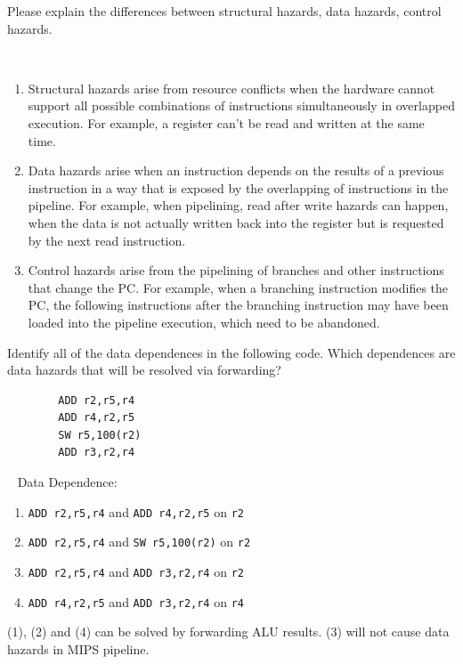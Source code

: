 \begin{exercise}[]{
    Please explain the differences between structural hazards, data hazards, control hazards.
    }
  \begin{solution}
  \par{~}
  \begin{enumerate}
      \item Structural hazards arise from resource conflicts when the hardware cannot support all possible combinations of instructions simultaneously in overlapped execution. For example, a register can't be read and written at the same time.
      \item Data hazards arise when an instruction depends on the results of a previous instruction in a way that is exposed by the overlapping of instructions in the pipeline. For example, when pipelining, read after write hazards can happen, when the data is not actually written back into the register but is requested by the next read instruction.
      \item Control hazards arise from the pipelining of branches and other instructions that change the PC. For example, when a branching instruction modifies the PC, the following instructions after the branching instruction may have been loaded into the pipeline execution, which need to be abandoned.
  \end{enumerate}
  \end{solution}
  \label{ex1}
\end{exercise}


\begin{exercise}[]{Identify all of the data dependences in the following code. Which dependences are data hazards that will be resolved via forwarding?}
    \begin{verbatim}
        ADD r2,r5,r4
        ADD r4,r2,r5
        SW r5,100(r2)
        ADD r3,r2,r4 
    \end{verbatim}
  \begin{solution}
  \par{~}
  Data Dependence:
  \begin{enumerate}
      \item \texttt{ADD r2,r5,r4} and \texttt{ADD r4,r2,r5} on \texttt{r2}
      \item \texttt{ADD r2,r5,r4} and \texttt{SW r5,100(r2)} on \texttt{r2}
      \item \texttt{ADD r2,r5,r4} and \texttt{ADD r3,r2,r4} on \texttt{r2}
      \item \texttt{ADD r4,r2,r5} and \texttt{ADD r3,r2,r4} on \texttt{r4}
  \end{enumerate}
  (1), (2) and (4) can be solved by forwarding ALU results. (3) will not cause data hazards in MIPS pipeline.
  \end{solution}
  \label{ex2}
\end{exercise}


